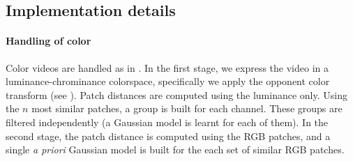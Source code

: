 \documentclass[10pt, journal, twocolumn, final, a4paper]{IEEEtran}
\begin{document}

\subsection{Implementation details}

\paragraph{Handling of color} Color videos are handled as in \cite{Lebrun2013a}.
%
In the first stage, we express the video in a luminance-chrominance colorspace,
specifically we apply the opponent color transform (see \cite{Dabov2007tip,Lebrun2013a}).
Patch distances are computed using the luminance only. Using the 
$n$ most similar patches, a group is built for each channel. These
groups are filtered independently (a Gaussian model is learnt for each of them).
%
In the second stage, the patch distance is computed using the RGB patches, and
a single \textit{a priori} Gaussian model is built for the each set
of similar RGB patches. 
\end{document}
